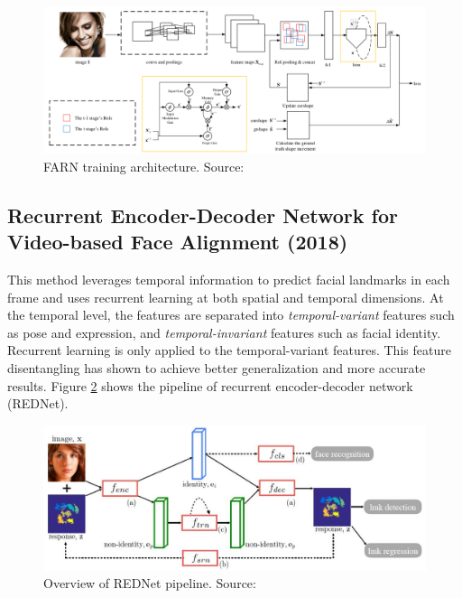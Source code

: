 \documentclass{llncs}
\begin{document}
\begin{figure}
	\centering
	\vspace{-5mm}
	\includegraphics[scale=0.3]{Media/farn_training2}
	\caption{FARN training architecture. Source:\cite{farn}}
	\label{farn_training}
	\vspace{-10mm}
\end{figure}
\vspace{-1mm}
	\subsection{Recurrent Encoder-Decoder Network for Video-based Face Alignment (2018) \cite{rednet}}
	This method leverages temporal information to predict facial landmarks in each frame and uses recurrent learning at both spatial and temporal dimensions. At the temporal level, the features are separated into \textit{temporal-variant} features such as pose and expression, and \textit{temporal-invariant} features such as facial identity. Recurrent learning is only applied to the temporal-variant features. This feature disentangling has shown to achieve better generalization and more accurate results. Figure \ref{rednet_architecture} shows the pipeline of recurrent encoder-decoder network (REDNet).
	
	\begin{figure}
		\centering
		\includegraphics[scale=0.5]{Media/rednet_architecture}
		\vspace{-3mm}
		\caption{Overview of REDNet pipeline. Source:\cite{rednet}}
		\label{rednet_architecture}
		\vspace{-3mm}
	\end{figure}
	
\end{document}
